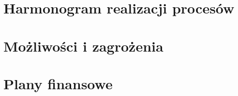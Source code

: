 \documentclass[12pt]{article}
\begin{document}
\section{Harmonogram realizacji procesów}


\section{Możliwości i zagrożenia}


\section{Plany finansowe}




\listoftables
\end{document}
